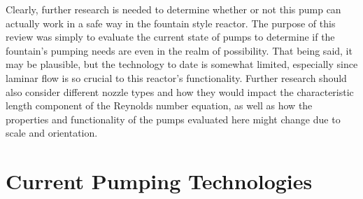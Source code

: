 \documentclass[11pt]{article}
\begin{document}
Clearly, further research is needed to determine whether or not this pump can actually work in a safe way in the fountain style reactor. The purpose of this review was simply to evaluate the current state of pumps to determine if the fountain’s pumping needs are even in the realm of possibility. That being said, it may be plausible, but the technology to date is somewhat limited, especially since laminar flow is so crucial to this reactor’s functionality. Further research should also consider different nozzle types and how they would impact the characteristic length component of the Reynolds number equation, as well as how the properties and functionality of the pumps evaluated here might change due to scale and orientation.

\newpage

\section{Current Pumping Technologies}
\end{document}
